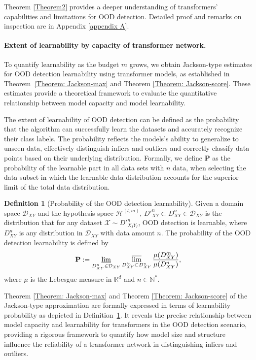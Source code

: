 \documentclass{article}
\theoremstyle{plain}
\theoremstyle{definition}
\newtheorem{definition}[theorem]{Definition}
\theoremstyle{remark}
\begin{document}
Theorem \ref{Theorem2} provides a deeper understanding of transformers' capabilities and limitations for OOD detection. Detailed proof and remarks on inspection are in Appendix \ref{appendix A}.

\paragraph{Extent of learnability by capacity of transformer network.}
To quantify learnability as the budget $m$ grows, we obtain Jackson-type estimates for OOD detection learnability using transformer models, as established in Theorem~\ref{Theorem: Jackson-max} and Theorem \ref{Theorem: Jackson-score}. 
These estimates provide a theoretical framework to evaluate the quantitative relationship between model capacity and model learnability.

The extent of learnability of OOD detection can be defined as the probability that the algorithm can successfully learn the datasets and accurately recognize their class labels. The probability reflects the models's ability to generalize to unseen data, effectively distinguish inliers and outliers and correctly classify data points based on their underlying distribution. Formally, we define $\mathbf{P}$ as the probability of the learnable part in all data sets with $n$ data, when selecting the data subset in which the learnable data distribution accounts for the superior limit of the total data distribution.
\begin{definition}
    [Probability of the OOD detection learnability]\label{def:prob learnability} Given a domain space $\mathcal{D}_{XY}$ and the hypothesis space $\mathcal{H}^{(l,m)}$, $D'^n_{XY}\subset D^n_{XY}\in \mathcal{D}_{XY}$ is the distribution that for any dataset $\mathcal{X}\sim D'^n_{X_IY_I}$, OOD detection is learnable, where $D^n_{XY}$ is any distribution in $\mathcal{D}_{XY}$ with data amount $n$. The probability of the OOD detection learnability is defined by
    \begin{equation}
    \small
        \mathbf{P}:=\varliminf_{D^n_{XY}\in \mathcal{D}_{XY}}\varlimsup_{D'^n_{XY}\subset D^n_{XY}}\frac{\mu( D'^n_{XY})}{\mu( D^n_{XY})},
    \end{equation}
    where $\mu$ is the Lebesgue measure in $\mathbb{R}^d$ and $n\in \mathbb{N}^{*}$.
    \label{def: prob}
\end{definition}

Theorem \ref{Theorem: Jackson-max} and Theorem \ref{Theorem: Jackson-score} of the Jackson-type approximation are formally expressed in terms of learnability probability as depicted in Definition~\ref{def:prob learnability}. It reveals the precise relationship between model capacity and learnability for transformers in the OOD detection scenario, providing a rigorous framework to quantify how model size and structure influence the reliability of a transformer network in distinguishing inliers and outliers.
\end{document}
